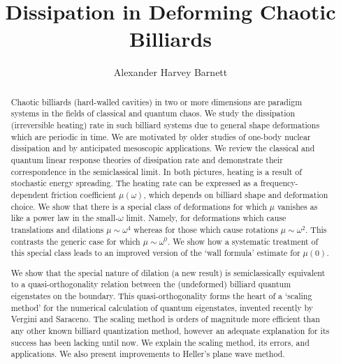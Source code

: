 
\title{Dissipation in Deforming Chaotic Billiards}
\author{Alexander Harvey Barnett}

\maketitle
\copyrightpage


\begin{abstract}

Chaotic billiards (hard-walled cavities)
in two or more dimensions are paradigm systems in the fields
of classical and quantum chaos.
We study the dissipation (irreversible heating) rate in such billiard systems
due to general shape deformations which are periodic in time.
We are motivated by older studies of one-body nuclear dissipation
and by anticipated mesoscopic applications.
We review the classical and quantum linear response theories of dissipation rate
and demonstrate their correspondence in the semiclassical
limit.
In both pictures, heating is a result of stochastic energy spreading.
The heating rate can be expressed as a frequency-dependent
friction coefficient $\mu(\omega)$, which
depends on billiard shape and deformation choice.
We show that there is a special class of deformations for which
$\mu$ vanishes as like a power law in the small-$\omega$ limit.
Namely, for deformations which cause translations and dilations
$\mu \sim \omega^4$ whereas for those which cause rotations $\mu \sim \omega^2$.
This contrasts the generic case for which $\mu \sim \omega^0$.
We show how a systematic treatment of this special class leads to
an improved version of the `wall formula' estimate for $\mu(0)$.

We show that the special nature of dilation (a new result)
is semiclassically equivalent to a
quasi-orthogonality relation between the (undeformed) billiard quantum
eigenstates on the boundary.
This quasi-orthogonality forms the heart of a `scaling method' for the numerical
calculation of quantum eigenstates, invented recently by Vergini and Saraceno.
The scaling method is orders of magnitude more efficient than any other
known billiard quantization method, however an adequate explanation for its
success has been lacking until now.
We explain the scaling method, its errors, and applications.
We also present improvements to Heller's plane wave method.


\end{abstract}
